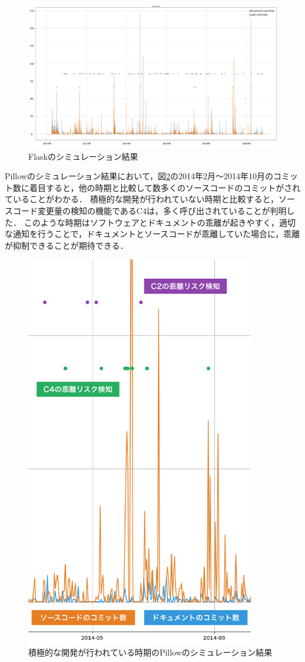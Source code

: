 \begin{figure}[H]
    \centering
    \includegraphics[width=14cm]{images/sim3.png}
    \caption{Flaskのシミュレーション結果}
    \label{sim3}
\end{figure}

Pillowのシミュレーション結果において，図\ref{simpillow}の2014年2月〜2014年10月のコミット数に着目すると，他の時期と比較して数多くのソースコードのコミットがされていることがわかる．
積極的な開発が行われていない時期と比較すると，ソースコード変更量の検知の機能であるC4は，多く呼び出されていることが判明した．
このような時期はソフトウェアとドキュメントの乖離が起きやすく，適切な通知を行うことで，ドキュメントとソースコードが乖離していた場合に，乖離が抑制できることが期待できる．
\begin{figure}[H]
    \centering
    \includegraphics[width=10cm]{images/pillow.png}
    \caption{積極的な開発が行われている時期のPillowのシミュレーション結果}
    \label{simpillow}
\end{figure}

